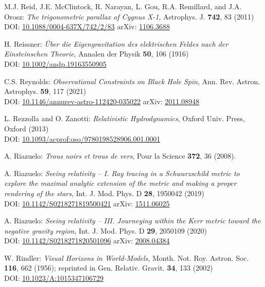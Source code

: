 \begin{thebibliography}{123}
M.J. Reid, J.E. McClintock, R. Narayan, L. Gou, R.A. Remillard, and J.A. Orosz:
{\em The trigonometric parallax of Cygnus X-1},
Astrophys. J. {\bf 742}, 83 (2011)\\
DOI: \href{https://doi.org/10.1088/0004-637X/742/2/83}{10.1088/0004-637X/742/2/83}\hfill
arXiv: \href{https://arxiv.org/abs/1106.3688}{1106.3688}

H. Reissner:
{\em Über die Eigengravitation des elektrischen Feldes nach der Einsteinschen Theorie},
Annalen der Physik {\bf 50}, 106 (1916)\\
DOI: \href{https://doi.org/10.1002/andp.19163550905}{10.1002/andp.19163550905}

C.S. Reynolds:
{\em Observational Constraints on Black Hole Spin},
Ann. Rev. Astron. Astrophys. {\bf 59}, 117 (2021)\\
DOI:  \href{https://doi.org/10.1146/annurev-astro-112420-035022}{10.1146/annurev-astro-112420-035022}\hfill
arXiv: \href{https://arxiv.org/abs/2011.08948}{2011.08948}

L. Rezzolla and O. Zanotti:
{\em Relativistic Hydrodynamics},
Oxford Univ. Press, Oxford (2013)\\
DOI: \href{https://doi.org/10.1093/acprof:oso/9780198528906.001.0001}{10.1093/acprof:oso/9780198528906.001.0001}

A. Riazuelo:
{\em Trous noirs et trous de vers},
Pour la Science {\bf 372}, 36 (2008).

A. Riazuelo:
{\em Seeing relativity -- I. Ray tracing in a Schwarzschild metric to explore the maximal analytic extension of the metric and making a proper rendering of the stars},
Int. J. Mod. Phys. D {\bf 28}, 1950042 (2019)\\
DOI: \href{https://doi.org/10.1142/S0218271819500421}{10.1142/S0218271819500421}
\hfill
arXiv: \href{https://arxiv.org/abs/1511.06025}{1511.06025}

A. Riazuelo:
{\em Seeing relativity -- III. Journeying within the Kerr metric toward the negative gravity region},
Int. J. Mod. Phys. D {\bf 29}, 2050109 (2020)\\
DOI: \href{https://doi.org/10.1142/S0218271820501096}{10.1142/S0218271820501096}\hfill
arXiv: \href{https://arxiv.org/abs/2008.04384}{2008.04384}

W. Rindler: {\em Visual Horizons in World-Models},
Month. Not. Roy. Astron. Soc. {\bf 116}, 662 (1956);
reprinted in Gen. Relativ. Gravit. {\bf 34}, 133 (2002)\\
DOI: \href{https://doi.org/10.1023/A:1015347106729}{10.1023/A:1015347106729}


\end{thebibliography}
